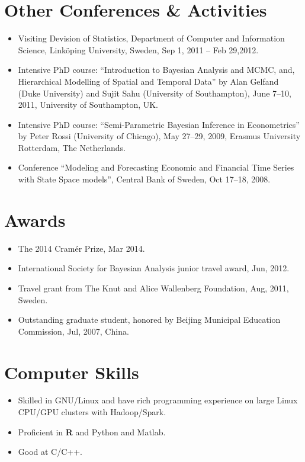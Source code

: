 \documentclass[twoside,a4paper]{article}
\begin{document}
\section*{Other Conferences \& Activities}
\begin{itemize}
\item Visiting Devision of Statistics, Department of Computer and Information Science, Linköping University, Sweden, Sep 1, 2011 -- Feb 29,2012.

\item Intensive PhD course: ``Introduction to Bayesian Analysis and MCMC, and, Hierarchical Modelling of Spatial and Temporal Data'' by Alan Gelfand (Duke University) and Sujit Sahu (University of Southampton), June 7--10, 2011, University of Southampton, UK.

\item Intensive PhD course: ``Semi-Parametric Bayesian Inference in Econometrics'' by Peter Rossi (University of Chicago), May 27--29, 2009, Erasmus University Rotterdam, The Netherlands.

\item Conference ``Modeling and Forecasting Economic and Financial Time Series with State Space models'', Central Bank of Sweden, Oct 17--18, 2008.
\end{itemize}

\section*{Awards}
\begin{itemize}

\item The 2014 Cramér Prize, Mar 2014.

\item International Society for Bayesian Analysis junior travel award, Jun, 2012.

\item Travel grant from The Knut and Alice Wallenberg Foundation, Aug, 2011, Sweden.

\item Outstanding graduate student, honored by Beijing Municipal Education Commission, Jul, 2007, China.

\end{itemize}


\section*{Computer Skills}
\begin{itemize}
\item Skilled in GNU/Linux and have rich programming experience on large Linux CPU/GPU clusters with Hadoop/Spark.
\item Proficient in \textbf{R} and Python and Matlab.
\item Good at C/C++.
\end{itemize}
\end{document}

